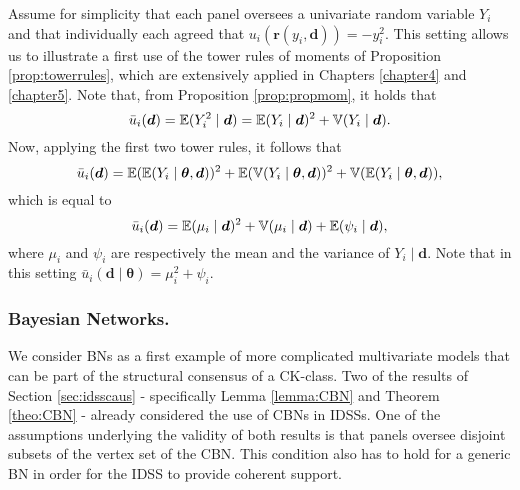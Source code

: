 \begin{example}
Assume for simplicity that each panel oversees a univariate random variable $Y_i$ and that individually each agreed that $u_i(\bm{r}(y_{i},\bm{d}))=-y_i^2$. This setting allows us to illustrate a first use of the tower rules of moments of Proposition \ref{prop:towerrules}, which are extensively applied in Chapters \ref{chapter4} and \ref{chapter5}.   Note that, from Proposition \ref{prop:propmom}, it holds that
\begin{equation*}
\bar{u}_i(\bm{d})=\mathbb{E}(Y_i^2\;|\;\bm{d})=\mathbb{E}(Y_i\;|\;\bm{d})^2+\mathbb{V}(Y_i\;|\;\bm{d}).
\end{equation*} 
Now, applying the first two tower rules, it follows that
\begin{equation*}
\bar{u}_i(\bm{d})=\mathbb{E}(\mathbb{E}(Y_i\;|\;\bm{\theta},\bm{d}))^2+\mathbb{E}(\mathbb{V}(Y_i\;|\;\bm{\theta},\bm{d}))^2+\mathbb{V}(\mathbb{E}(Y_i\;|\;\bm{\theta},\bm{d})),
\end{equation*}
which is equal to
\begin{equation*}
\label{eq:index1}
\bar{u}_i(\bm{d})=\E(\mu_i\;|\;\bm{d})^2+\V(\mu_i\;|\;\bm{d})+\E(\psi_i\;|\;\bm{d}),
\end{equation*}
where $\mu_i$ and $\psi_i$ are respectively the mean and the variance of $Y_i\;|\;\bm{d}$.  Note that in this setting $\bar{u}_i(\bm{d}\;|\;\bm{\theta})=\mu_i^2+\psi_i.$
\end{example}
\subsubsection{Bayesian Networks.}
We consider BNs as a first example of more complicated multivariate models that can be part of the structural consensus of a CK-class. Two of the results of Section \ref{sec:idsscaus} - specifically Lemma \ref{lemma:CBN} and Theorem \ref{theo:CBN} - already considered the use of CBNs in IDSSs. One of the assumptions underlying the validity of both results is that panels oversee disjoint subsets of the vertex set of the CBN. This condition also has to hold for a generic BN in order for the IDSS to provide coherent support. 


